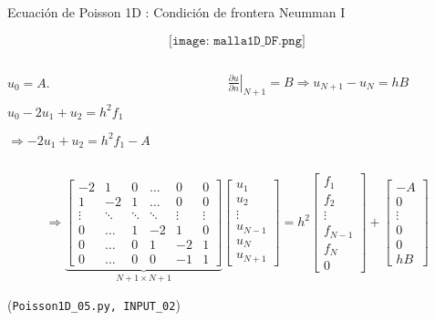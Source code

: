 \documentclass[handout]{beamer}
\begin{document}
		
\begin{frame}{Ecuaci\'on de Poisson 1D : Condici\'on de frontera Neumman I}

$$\texttt{[image: malla1D\_DF.png]}$$

\begin{footnotesize}
\begin{columns}
\begin{column}{0.45\textwidth}
$ u_0  = A $.

$u_{0} - 2 u_{1} + u_{2} = h^2 f_1$ 

$\Rightarrow \boxed{-2 u_{1} + u_{2} = h^2 f_1 - A}$
\end{column}
\begin{column}{0.5\textwidth}
$\left.\displaystyle \frac{\partial u}{\partial n}\right|_{N+1}  = B \Longrightarrow \boxed{u_{N+1} - u_{N} = h B}$  

\end{column}
\end{columns}

\pause

\strut

\[
\Longrightarrow
\underbrace{
\left[
  \begin{matrix}
    -2 & 1 & 0  & \dots & 0 & 0  \\
    1 & -2 & 1  & \dots & 0 & 0 \\
    \vdots & \ddots & \ddots & \ddots & \vdots & \vdots \\
    0 & \dots & 1 & -2 & 1 & 0 \\
    0 & \dots & 0 & 1 & -2 & 1 \\
    0 & \dots & 0 & 0 & -1 & 1        
  \end{matrix}
\right] 
}_{N+1 \times N+1}
\left[
\begin{matrix}
u_1 \\ u_2 \\ \vdots \\ u_{N-1} \\ u_N \\ u_{N+1}
\end{matrix}
\right]= 
h^2 \left[
\begin{matrix}
f_1 \\ f_2 \\ \vdots \\ f_{N-1} \\ f_N \\ 0
\end{matrix}
\right] +
\left[
\begin{matrix}
-A \\ 0 \\  \vdots \\ 0 \\ 0 \\ hB
\end{matrix}
\right]
\]

(\texttt{Poisson1D\_05.py, INPUT\_02})
\end{footnotesize}

\end{frame}
\end{document}
